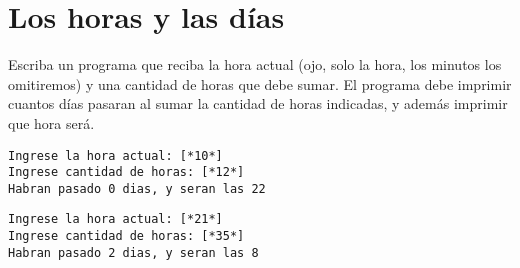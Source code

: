 \section{Los horas y las días}

Escriba un programa que reciba la hora actual (ojo, solo la hora, los minutos los omitiremos) y una cantidad de horas que debe sumar. El programa debe imprimir cuantos días pasaran al sumar la cantidad de horas indicadas, y además imprimir que hora será.

\begin{lstlisting}[style=consola]
Ingrese la hora actual: [*10*]
Ingrese cantidad de horas: [*12*]
Habran pasado 0 dias, y seran las 22
\end{lstlisting}


\begin{lstlisting}[style=consola]
Ingrese la hora actual: [*21*]
Ingrese cantidad de horas: [*35*]
Habran pasado 2 dias, y seran las 8
\end{lstlisting}
